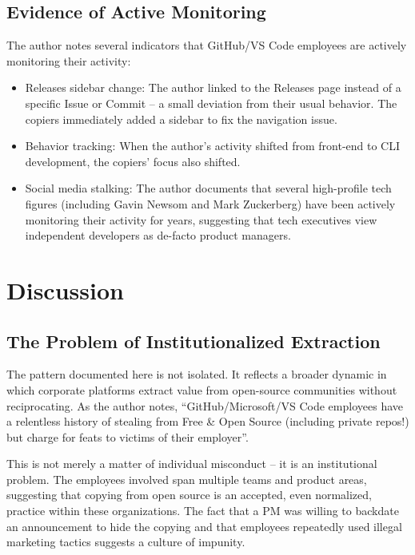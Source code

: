 \documentclass[12pt]{article}
\begin{document}
\subsection{Evidence of Active Monitoring}
The author notes several indicators that GitHub/VS Code employees are actively monitoring their activity:
\begin{itemize}
\item Releases sidebar change: The author linked to the Releases page instead of a specific Issue or Commit -- a small deviation from their usual behavior. The copiers immediately added a sidebar to fix the navigation issue.
\item Behavior tracking: When the author's activity shifted from front-end to CLI development, the copiers' focus also shifted.
\item Social media stalking: The author documents that several high-profile tech figures (including Gavin Newsom and Mark Zuckerberg) have been actively monitoring their activity for years, suggesting that tech executives view independent developers as de-facto product managers.
\end{itemize}

\section{Discussion}

\subsection{The Problem of Institutionalized Extraction}
The pattern documented here is not isolated. It reflects a broader dynamic in which corporate platforms extract value from open-source communities without reciprocating. As the author notes, ``GitHub/Microsoft/VS Code employees have a relentless history of stealing from Free \& Open Source (including private repos!) but charge for feats to victims of their employer''.

This is not merely a matter of individual misconduct -- it is an institutional problem. The employees involved span multiple teams and product areas, suggesting that copying from open source is an accepted, even normalized, practice within these organizations. The fact that a PM was willing to backdate an announcement to hide the copying and that employees repeatedly used illegal marketing tactics suggests a culture of impunity.
\end{document}

